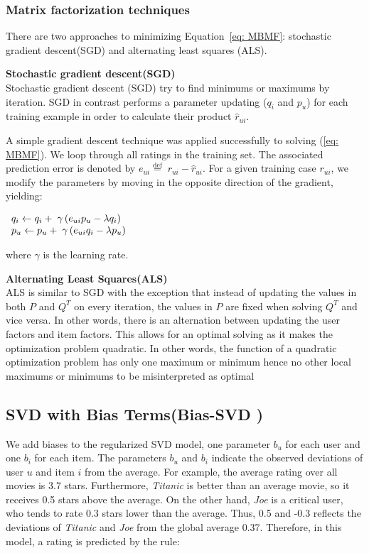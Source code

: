 \documentclass[oneside,13pt]{extreport}
\begin{document}
\subsubsection{Matrix factorization techniques}
There are two approaches to minimizing Equation~\ref{eq: MBMF}: stochastic
gradient descent(SGD) and alternating least squares (ALS).
\begin{description}
    \item{\textbf{Stochastic gradient descent(SGD)}} 
    \\Stochastic gradient descent (SGD) try to find minimums or maximums by iteration. SGD in contrast performs a parameter updating ($q_i$ and $p_u$) for each training example in order to calculate their product $\hat r_{ui}$.
    
    A simple gradient descent technique was applied successfully to solving (\ref{eq: MBMF}).
We loop through all ratings in the training set. The associated prediction error is denoted by ${e_{ui}} \stackrel{\text{def}}{=} \;{r_{ui}} - \hat r_{ui}$. For a given training case $r_{ui}$, we modify the parameters by moving in the opposite direction of the gradient, yielding:

$\begin{array}{l}{q_i} \leftarrow {q_i} + {\rm{\;}}\gamma \left( {{e_{ui}}{p_u} - {\lambda}{q_i}} \right)\\{p_u} \leftarrow {p_u} + {\rm{\;}}\gamma \left( {{e_{ui}}{q_i} - {\lambda}{p_u}} \right)\end{array}
$

where $\gamma$ is the learning rate.
    \item{\textbf{Alternating Least Squares(ALS)}}
    \\ALS is similar to SGD with the exception that instead of updating the values
in both $P$ and $Q^T$ on every iteration, the values in $P$ are fixed when solving $Q^T$
and vice versa. In other words, there is an alternation between updating the
user factors and item factors. This allows for an optimal solving as it makes the
optimization problem quadratic. In other words, the function of a quadratic
optimization problem has only one maximum or minimum hence no other local
maximums or minimums to be misinterpreted as optimal
\end{description}



\subsection{SVD with Bias Terms(Bias-SVD )}
We add biases to the regularized SVD model, one parameter $b_u$ for each user and one $b_i$ for each item. The parameters $b_u$ and $b_i$ indicate the observed deviations of user $u$ and item $i$ from the average. For example, the average rating over all movies is 3.7 stars. Furthermore, \emph{Titanic} is better than an average movie, so it receives 0.5 stars above the average. On the other hand, \emph{Joe} is a critical user, who tends to rate 0.3 stars lower than the average. Thus, 0.5 and -0.3 reflects the deviations of \emph{Titanic} and \emph{Joe} from the global average 0.37. Therefore, in this model,
a rating is predicted by the rule:
\end{document}

